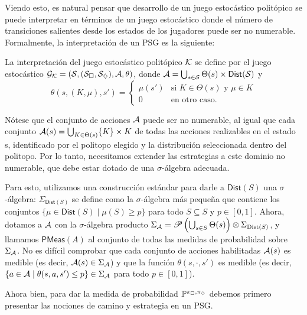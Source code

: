 Viendo esto, es natural pensar que desarrollo de un juego estocástico
politópico se puede interpretar en términos de un juego estocástico donde el
número de transiciones salientes desde los estados de los jugadores puede ser
no numerable. Formalmente, la interpretación de un PSG es la siguiente:

\begin{definition}
	La interpretación del juego estocástico politópico \( \mathcal{K} \) se define por el juego estocástico \( \mathcal{G}_{\mathcal{K}} = (\mathcal{S}, (\mathcal{S}_\square, \mathcal{S}_\diamondsuit), \mathcal{A}, \theta) \), donde \( \mathcal{A} = \bigcup_{s \in \mathcal{S}} \Theta(s) \times \textsf{Dist}(\mathcal{S}) \) y
	\[
		\theta(s, (K, \mu), s') =
		\begin{cases}
			\mu(s') & \text{si } K \in \Theta(s) \text{ y } \mu \in K \\
			0 & \text{en otro caso}.
		\end{cases}
	\]
\end{definition}

Nótese que el conjunto de acciones \( \mathcal{A} \) puede ser no numerable, al igual
que cada conjunto \( \mathcal{A}(s) = \bigcup_{K \in \Theta(s)} \{K\} \times K \) de
todas las acciones realizables en el estado s, identificado por el politopo
elegido y la distribución seleccionada dentro del politopo. Por lo tanto,
necesitamos extender las estrategias a este dominio no numerable, que debe
estar dotado de una \( \sigma \)-álgebra adecuada.

Para esto, utilizamos una construcción estándar para darle a \(
\textsf{Dist}(S) \) una \( \sigma \)-álgebra: \( \Sigma_{\textsf{Dist}(S)} \)
se define como la \( \sigma \)-álgebra más pequeña que contiene los conjuntos
\( \{\mu \in \textsf{Dist}(S) \mid \mu(S) \geq p\} \) para todo \( S \subseteq
S \) y \( p \in [0, 1] \). Ahora, dotamos a \( \mathcal{A} \) con la \( \sigma
\)-álgebra producto \( \Sigma_{\mathcal{A}} = \mathscr{P} \left(\bigcup_{s \in S}
\Theta(s)\right) \otimes \Sigma_{\text{Dist}(S)} \), y llamamos \(
\textsf{PMeas}(A) \) al conjunto de todas las medidas de probabilidad sobre \(
\Sigma_{\mathcal{A}} \). No es difícil comprobar que cada conjunto de acciones
habilitadas \( \mathcal{A}(s) \) es medible (es decir, \( \mathcal{A}(s) \in \Sigma_{\mathcal{A}} \))
y que la función \( \theta(s, \cdot, s') \) es medible (es decir, \( \{a \in
\mathcal{A} \mid \theta(s, a, s') \leq p\} \in \Sigma_{\mathcal{A}} \) para todo \( p \in [0,
	1] \)).

Ahora bien, para dar la medida de probabilidad $\mathbb{P}^{\pi_\square, \pi_\diamondsuit}$
debemos primero presentar las nociones de camino y estrategia en un PSG.

